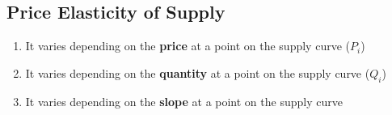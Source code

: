 \subsection{Price Elasticity of Supply}
\begin{enumerate}
	\item It varies depending on the \textbf{price} at a point on the supply curve ($P_i$)
	\item It varies depending on the \textbf{quantity} at a point on the supply curve ($Q_i$)
	\item It varies depending on the \textbf{slope} at a point on the supply curve
\end{enumerate}